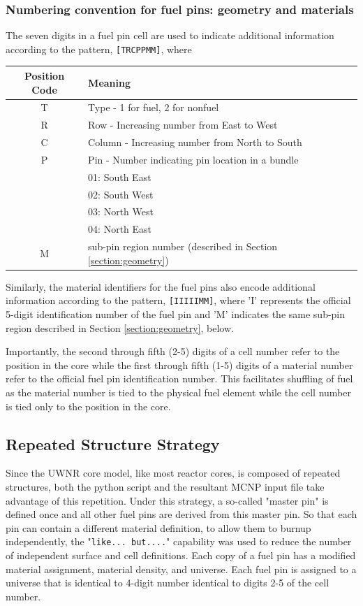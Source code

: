 \documentclass{UWNR_modeling}
\begin{document}
\subsubsection{Numbering convention for fuel pins: geometry and materials}

The seven digits in a fuel pin cell are used to indicate additional information according to the pattern, 
\texttt{[TRCPPMM]}, where

\begin{tabular}{|c|l|}
\hline
Position Code & Meaning \\\hline
T & Type     - 1 for fuel, 2 for nonfuel\\
R & Row      - Increasing number from East to West\\
C & Column   - Increasing number from North to South\\
P & Pin      - Number indicating pin location in a bundle\\
 & 01: South East\\
 & 02: South West\\
 & 03: North West\\
 & 04: North East\\
M & sub-pin region number (described in Section \ref{section:geometry})\\\hline
\end{tabular}

Similarly, the material identifiers for the fuel pins also encode additional information according to the pattern,
\texttt{[IIIIIMM]}, where 'I' represents the official 5-digit identification number of the fuel pin and 'M' indicates the same sub-pin region described in Section \ref{section:geometry}, below.

Importantly, the second through fifth (2-5) digits of a cell number refer to the position in the core while the first through fifth (1-5) digits of a material number refer to the official fuel pin identification number.  This facilitates shuffling of fuel as the material number is tied to the physical fuel element while the cell number is tied only to the position in the core.

\subsection{Repeated Structure Strategy}

Since the UWNR core model, like most reactor cores, is composed of repeated structures, both the python script and the resultant MCNP input file take advantage of this repetition.  Under this strategy, a so-called "master pin" is defined once and all other fuel pins are derived from this master pin.  So that each pin can contain a different material definition, to allow them to burnup independently, the "\texttt{like... but....}" capability was used to reduce the number of independent surface and cell definitions.  Each copy of a fuel pin has a modified material assignment, material density, and universe.  Each fuel pin is assigned to a universe that is identical to 4-digit number identical to digits 2-5 of the cell number.  
\end{document}
